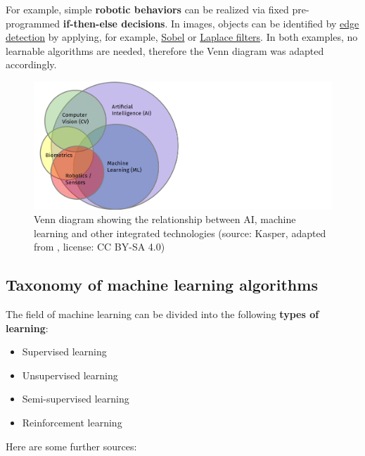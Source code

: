 \documentclass [oneside,10pt,a4paper,ngerman,BCOR10mm,headsepline,parindent,final]{scrartcl}
\providecommand{\tightlist}{%
      \setlength{\itemsep}{0pt}\setlength{\parskip}{0pt}}
\begin{document}
For example, simple \textbf{robotic behaviors} can be realized via fixed
pre-programmed \textbf{if-then-else decisions}. In images, objects can
be identified by
\href{https://en.wikipedia.org/wiki/Edge_detection}{edge detection} by
applying, for example,
\href{https://en.wikipedia.org/wiki/Sobel_operator}{Sobel} or
\href{https://en.wikipedia.org/wiki/Laplace_operator}{Laplace filters}.
In both examples, no learnable algorithms are needed, therefore the Venn
diagram was adapted accordingly.

    \begin{figure}
\centering
\includegraphics{images/AI_ML_venn_diagram_wide.png}
\caption{Venn diagram showing the relationship between AI, machine
learning and other integrated technologies (source: Kasper, adapted from
\cite{AI_beverages_2019}, license: CC BY-SA 4.0)}
\end{figure}

    \hypertarget{taxonomy-of-machine-learning-algorithms}{%
\subsection{Taxonomy of machine learning
algorithms}\label{taxonomy-of-machine-learning-algorithms}}

The field of machine learning can be divided into the following
\textbf{types of learning}:

\begin{itemize}
\tightlist
\item
  Supervised learning
\item
  Unsupervised learning
\item
  Semi-supervised learning
\item
  Reinforcement learning
\end{itemize}

Here are some further sources:
\end{document}
